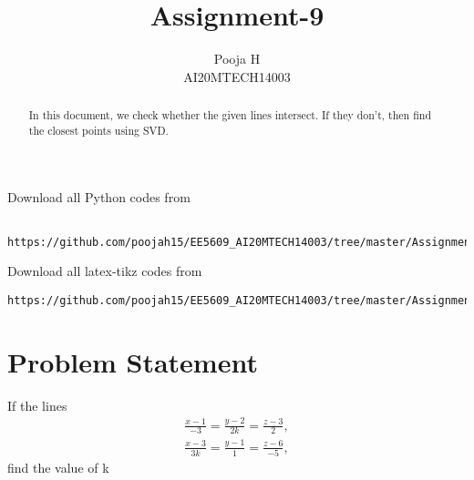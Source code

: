 \documentclass[journal,12pt,twocolumn]{IEEEtran}
\begin{document}
\let\vec\mathbf
\renewcommand{\thefigure}{\theproblem}
\def\putbox#1#2#3{\makebox[0in][l]{\makebox[#1][l]{}\raisebox{\baselineskip}[0in][0in]{\raisebox{#2}[0in][0in]{#3}}}}
     \def\rightbox#1{\makebox[0in][r]{#1}}
     \def\centbox#1{\makebox[0in]{#1}}
     \def\topbox#1{\raisebox{-\baselineskip}[0in][0in]{#1}}
     \def\midbox#1{\raisebox{-0.5\baselineskip}[0in][0in]{#1}}
\vspace{3cm}
\title{Assignment-9}
\author{Pooja H \\ AI20MTECH14003}
\maketitle
\newpage
\bigskip
\renewcommand{\thefigure}{\theenumi}
\renewcommand{\thetable}{\theenumi}
\begin{abstract}
In this document, we check whether the given lines intersect. If they don't, then find the closest points using SVD.
\end{abstract}
Download all Python codes from 
\begin{lstlisting}
	https://github.com/poojah15/EE5609_AI20MTECH14003/tree/master/Assignment_9
\end{lstlisting}
Download all latex-tikz codes from 
\begin{lstlisting}
https://github.com/poojah15/EE5609_AI20MTECH14003/tree/master/Assignment_9
\end{lstlisting}
\section{Problem Statement}
If the lines
\begin{align}
	\frac{x - 1}{-3} = \frac{y - 2}{2k} = \frac{z - 3}{2},\\
	\frac{x - 3}{3k} = \frac{y - 1}{1} = \frac{z - 6}{-5},
\end{align}
find the value of k
\end{document}
